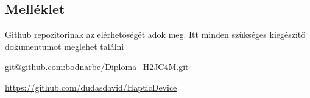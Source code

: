 \appendix
\chapter*{\melleklet}
\setcounter{chapter}{\annexletter} %
\setcounter{section}{0}

\section{Melléklet}
\label{sec:melleklet}

Github repozitorinak az elérhetőségét adok meg. Itt minden szükséges kiegészítő dokumentumot meglehet találni

\url{git@github.com:bodnarbe/Diploma_H2JC4M.git}

\url{https://github.com/dudasdavid/HapticDevice}
